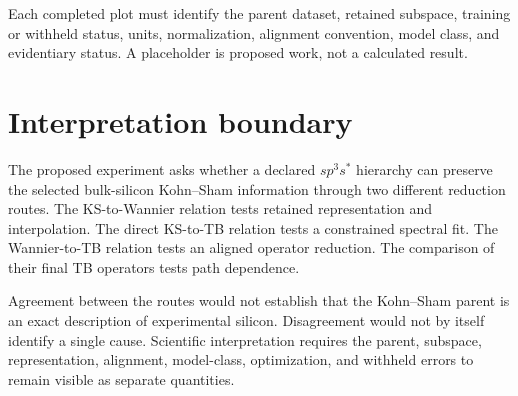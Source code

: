 Each completed plot must identify the parent dataset, retained subspace,
training or withheld status, units, normalization, alignment convention, model
class, and evidentiary status. A placeholder is proposed work, not a calculated
result.

\section*{Interpretation boundary}

The proposed experiment asks whether a declared $sp^3s^{\ast}$ hierarchy can
preserve the selected bulk-silicon Kohn--Sham information through two different
reduction routes. The KS-to-Wannier relation tests retained representation and
interpolation. The direct KS-to-TB relation tests a constrained spectral fit.
The Wannier-to-TB relation tests an aligned operator reduction. The comparison
of their final TB operators tests path dependence.

Agreement between the routes would not establish that the Kohn--Sham parent is
an exact description of experimental silicon. Disagreement would not by itself
identify a single cause. Scientific interpretation requires the parent,
subspace, representation, alignment, model-class, optimization, and withheld
errors to remain visible as separate quantities.
